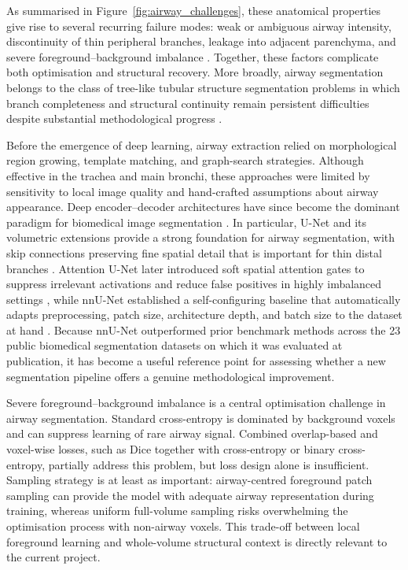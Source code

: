 \documentclass[11pt,a4paper]{article}
\begin{document}
As summarised in Figure~\ref{fig:airway_challenges}, these anatomical properties give rise to several recurring failure modes: weak or ambiguous airway intensity, discontinuity of thin peripheral branches, leakage into adjacent parenchyma, and severe foreground--background imbalance \cite{Nan2024FANN}. Together, these factors complicate both optimisation and structural recovery. More broadly, airway segmentation belongs to the class of tree-like tubular structure segmentation problems in which branch completeness and structural continuity remain persistent difficulties despite substantial methodological progress \cite{Li2022TreelikeReview}.

Before the emergence of deep learning, airway extraction relied on morphological region growing, template matching, and graph-search strategies. Although effective in the trachea and main bronchi, these approaches were limited by sensitivity to local image quality and hand-crafted assumptions about airway appearance. Deep encoder--decoder architectures have since become the dominant paradigm for biomedical image segmentation \cite{Ronneberger2015UNet,Cicek2016_3DUNet}. In particular, U-Net and its volumetric extensions provide a strong foundation for airway segmentation, with skip connections preserving fine spatial detail that is important for thin distal branches \cite{Ronneberger2015UNet,Cicek2016_3DUNet}. Attention U-Net later introduced soft spatial attention gates to suppress irrelevant activations and reduce false positives in highly imbalanced settings \cite{Oktay2018AttentionUNet}, while nnU-Net established a self-configuring baseline that automatically adapts preprocessing, patch size, architecture depth, and batch size to the dataset at hand \cite{Isensee2021nnUNet}. Because nnU-Net outperformed prior benchmark methods across the 23 public biomedical segmentation datasets on which it was evaluated at publication, it has become a useful reference point for assessing whether a new segmentation pipeline offers a genuine methodological improvement. 

Severe foreground--background imbalance is a central optimisation challenge in airway segmentation. Standard cross-entropy is dominated by background voxels and can suppress learning of rare airway signal. Combined overlap-based and voxel-wise losses, such as Dice together with cross-entropy or binary cross-entropy, partially address this problem, but loss design alone is insufficient. Sampling strategy is at least as important: airway-centred foreground patch sampling can provide the model with adequate airway representation during training, whereas uniform full-volume sampling risks overwhelming the optimisation process with non-airway voxels. This trade-off between local foreground learning and whole-volume structural context is directly relevant to the current project.
\end{document}
